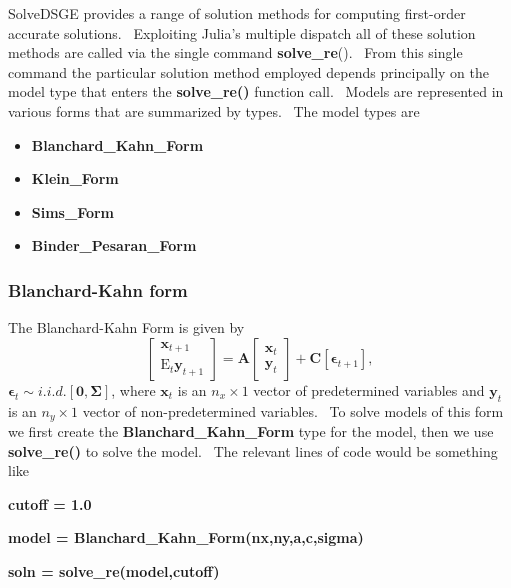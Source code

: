 \documentclass[thmsa,notitlepage,11pt]{article}
\begin{document}
SolveDSGE provides a range of solution methods for computing first-order
accurate solutions. \ Exploiting Julia's multiple dispatch all of these
solution methods are called via the single command \textbf{solve\_re}(). \
From this single command the particular solution method employed depends
principally on the model type that enters the \textbf{solve\_re()} function
call. \ Models are represented in various forms that are summarized by
types. \ The model types are

\begin{itemize}
\item \textbf{Blanchard\_Kahn\_Form}

\item \textbf{Klein\_Form}

\item \textbf{Sims\_Form}

\item \textbf{Binder\_Pesaran\_Form}
\end{itemize}

\subsubsection{Blanchard-Kahn form}

The Blanchard-Kahn Form is given by%
\[
\left[ 
\begin{array}{c}
\mathbf{x}_{t+1} \\ 
\text{E}_{t}\mathbf{y}_{t+1}%
\end{array}%
\right] =\mathbf{A}\left[ 
\begin{array}{c}
\mathbf{x}_{t} \\ 
\mathbf{y}_{t}%
\end{array}%
\right] +\mathbf{C}\left[ \mathbf{\epsilon }_{t+1}\right] , 
\]%
$\mathbf{\epsilon }_{t}\sim i.i.d.[\mathbf{0},\mathbf{\Sigma }]$, where $%
\mathbf{x}_{t}$ is an $n_{x}\times 1$ vector of predetermined variables and $%
\mathbf{y}_{t}$ is an $n_{y}\times 1$ vector of non-predetermined variables.
\ To solve models of this form we first create the \textbf{%
Blanchard\_Kahn\_Form} type for the model, then we use \textbf{solve\_re()}
to solve the model. \ The relevant lines of code would be something like

\bigskip

\textbf{cutoff = 1.0}

\textbf{model = Blanchard\_Kahn\_Form(nx,ny,a,c,sigma)}

\textbf{soln = solve\_re(model,cutoff)}
\end{document}
